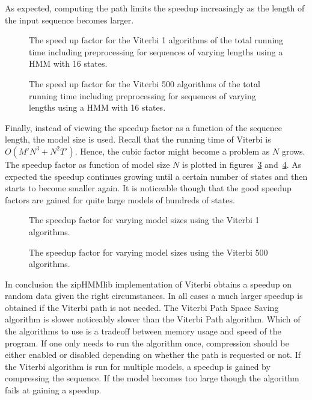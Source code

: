 As expected, computing the path limits the speedup increasingly as the length
of the input sequence becomes larger.

\begin{figure}
  \centering
  
  \caption{The speed up factor for the Viterbi 1 algorithms of the total
    running time including preprocessing for sequences of varying lengths using
    a HMM with 16 states.}
  \label{fig:compressed_1_speedup_vs_sequence_length}
\end{figure}

\begin{figure}
  \centering
  
  \caption{The speed up factor for the Viterbi 500 algorithms of the total
    running time including preprocessing for sequences of varying lengths using
    a HMM with 16 states.}
  \label{fig:compressed_500_speedup_vs_sequence_length}
\end{figure}

Finally, instead of viewing the speedup factor as a function of the sequence
length, the model size is used. Recall that the running time of Viterbi is
$O(M' N^3 + N^2 T')$. Hence, the cubic factor might become a problem as $N$
grows. The speedup factor as function of model size $N$ is plotted in
figures~\ref{fig:speedup_vs_k} and~\ref{fig:speedup_vs_k2}. As expected the
speedup continues growing until a certain number of states and then starts to
become smaller again. It is noticeable though that the good speedup factors are
gained for quite large models of hundreds of states.

\begin{figure}
  \centering
  
  \caption{The speedup factor for varying model sizes using the Viterbi 1
    algorithms.}
  \label{fig:speedup_vs_k}
\end{figure}

\begin{figure}
  \centering
  
  \caption{The speedup factor for varying model sizes using the Viterbi 500
    algorithms.}
  \label{fig:speedup_vs_k2}
\end{figure}

In conclusion the zipHMMlib implementation of Viterbi obtains a speedup on
random data given the right circumstances. In all cases a much larger speedup
is obtained if the Viterbi path is not needed. The Viterbi Path Space Saving
algorithm is slower noticeably slower than the Viterbi Path algorithm. Which
of the algorithms to use is a tradeoff between memory usage and speed of the
program. If one only needs to run the algorithm once, compression should be
either enabled or disabled depending on whether the path is requested or
not. If the Viterbi algorithm is run for multiple models, a speedup is gained
by compressing the sequence. If the model becomes too large though the
algorithm fails at gaining a speedup.

